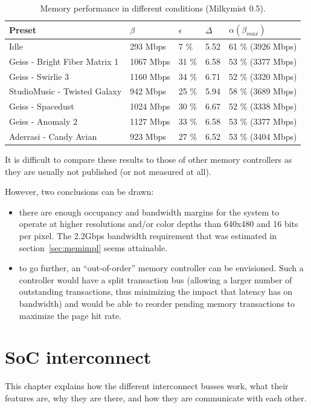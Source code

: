 \documentclass[a4paper,11pt]{kthesis}
\begin{document}
\begin{table}
\centering
\begin{tabular}{|l|l|l|l|l|}
\hline
\textbf{Preset} & $\beta$ & $\epsilon$ & $\Delta$ & $\alpha(\beta_{max})$ \\
\hline
Idle & 293 Mbps & 7 \% & 5.52 & 61 \% (3926 Mbps) \\
\hline
Geiss - Bright Fiber Matrix 1 & 1067 Mbps & 31 \% & 6.58 & 53 \% (3377 Mbps) \\
\hline
Geiss - Swirlie 3 & 1160 Mbps & 34 \% & 6.71 & 52 \% (3320 Mbps) \\
\hline
StudioMusic - Twisted Galaxy & 942 Mbps & 25 \% & 5.94 & 58 \% (3689 Mbps) \\
\hline
Geiss - Spacedust & 1024 Mbps & 30 \% & 6.67 & 52 \% (3338 Mbps) \\
\hline
Geiss - Anomaly 2 & 1127 Mbps & 33 \% & 6.58 & 53 \% (3377 Mbps) \\
\hline
Aderrasi - Candy Avian & 923 Mbps & 27 \% & 6.52 & 53 \% (3404 Mbps) \\
\hline
\end{tabular}
\caption{Memory performance in different conditions (Milkymist 0.5).} \label{tab:memperformance}
\end{table}

It is difficult to compare these results to those of other memory controllers as they are usually not published (or not measured at all).

However, two conclusions can be drawn:
\begin{itemize}
\item there are enough occupancy and bandwidth margins for the system to operate at higher resolutions and/or color depths than 640x480 and 16 bits per pixel. The 2.2Gbps bandwidth requirement that was estimated in section~\ref{sec:memimpl} seems attainable.
\item to go further, an ``out-of-order'' memory controller can be envisioned. Such a controller would have a split transaction bus (allowing a larger number of outstanding transactions, thus minimizing the impact that latency has on bandwidth) and would be able to reorder pending memory transactions to maximize the page hit rate.
\end{itemize}

\chapter{SoC interconnect}
\label{ch:intercon}
This chapter explains how the different interconnect busses work, what their features are, why they are there, and how they are communicate with each other.
\end{document}
